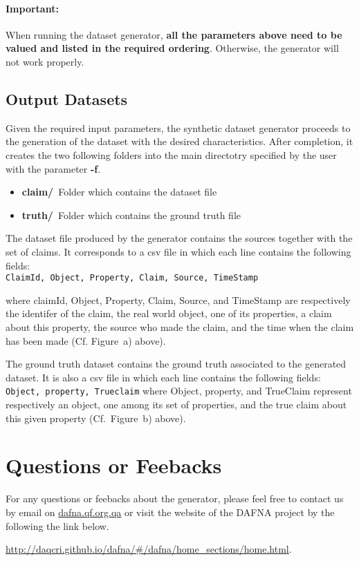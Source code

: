 \documentclass[a4paper,10pt]{scrartcl}
\newcommand{\claim}[1]{\vspace*{0.5cm}\\\indent\indent\texttt{#1}\vspace*{0.5cm}}
\begin{document}
\paragraph{Important:}When running the dataset generator, \textbf{all the parameters above need to be valued and listed in the required ordering}.
Otherwise, the generator will not work properly.

\subsection{Output Datasets}
Given the required input parameters, the synthetic dataset generator proceeds to the generation 
of the dataset with the desired characteristics. After completion, it creates the two following
folders into the main directotry specified by the user with the parameter \textbf{-f}.
\begin{itemize}
 \item \textbf{claim/}~Folder which contains the dataset file 
 \item \textbf{truth/}~Folder which contains the ground truth file
\end{itemize}

The dataset file produced by the generator contains the sources together with the set of claims.
It corresponds to a csv file in which each line	contains the following fields:
\claim{ClaimId, Object, Property, Claim, Source, TimeStamp}

\noindent where claimId, Object, Property, Claim, Source, and TimeStamp are respectively the identifer of the claim,
the real world object, one of its properties, a claim about this property, the source who made the claim, and
the time when the claim has been made (Cf. Figure~a) above).

The ground truth dataset contains the ground truth associated to the generated dataset. It is also a csv file in which each line
contains the following fields:
\claim{Object, property, Trueclaim}
where Object, property, and TrueClaim represent respectively an object, one among its set of properties, and the true claim about
this given property (Cf.\ Figure~b) above).

\section{Questions or Feebacks}
For any questions or feebacks about the generator, please feel free to contact us by email on \href{mailto:lberti@qf.org.qa}{dafna.qf.org.qa}
or visit the website of the DAFNA project by the following the link below.

\href{http://daqcri.github.io/dafna/\#/dafna/home\_sections/home.html}{http://daqcri.github.io/dafna/\#/dafna/home\_sections/home.html}.
\end{document}
